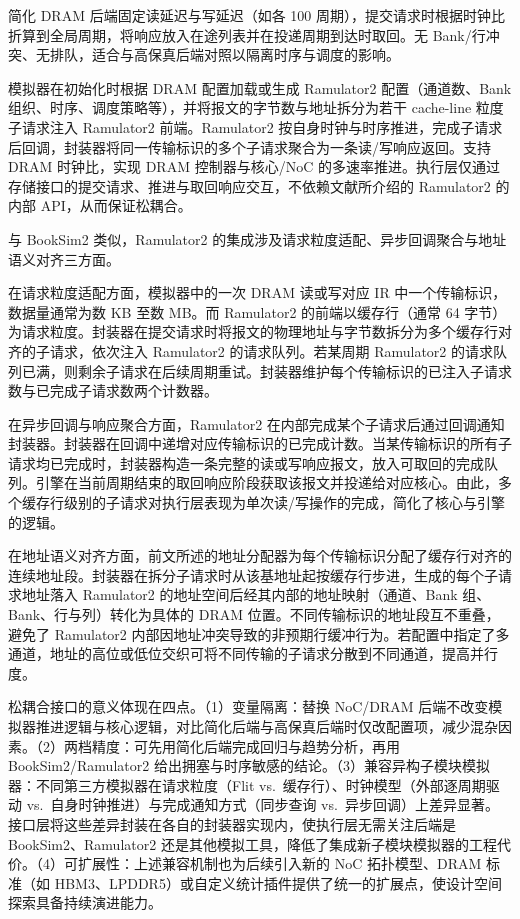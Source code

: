 
简化 DRAM 后端固定读延迟与写延迟（如各 100 周期），提交请求时根据时钟比折算到全局周期，将响应放入在途列表并在投递周期到达时取回。无 Bank/行冲突、无排队，适合与高保真后端对照以隔离时序与调度的影响。

模拟器在初始化时根据 DRAM 配置加载或生成 Ramulator2 配置（通道数、Bank 组织、时序、调度策略等），并将报文的字节数与地址拆分为若干 cache-line 粒度子请求注入 Ramulator2 前端。Ramulator2 按自身时钟与时序推进，完成子请求后回调，封装器将同一传输标识的多个子请求聚合为一条读/写响应返回。支持 DRAM 时钟比，实现 DRAM 控制器与核心/NoC 的多速率推进。执行层仅通过存储接口的提交请求、推进与取回响应交互，不依赖文献\parencite{luo2023ramulator2}所介绍的 Ramulator2 的内部 API，从而保证松耦合。

与 BookSim2 类似，Ramulator2 的集成涉及请求粒度适配、异步回调聚合与地址语义对齐三方面。

在请求粒度适配方面，模拟器中的一次 DRAM 读或写对应 IR 中一个传输标识，数据量通常为数 KB 至数 MB。而 Ramulator2 的前端以缓存行（通常 64 字节）为请求粒度。封装器在提交请求时将报文的物理地址与字节数拆分为多个缓存行对齐的子请求，依次注入 Ramulator2 的请求队列。若某周期 Ramulator2 的请求队列已满，则剩余子请求在后续周期重试。封装器维护每个传输标识的已注入子请求数与已完成子请求数两个计数器。

在异步回调与响应聚合方面，Ramulator2 在内部完成某个子请求后通过回调通知封装器。封装器在回调中递增对应传输标识的已完成计数。当某传输标识的所有子请求均已完成时，封装器构造一条完整的读或写响应报文，放入可取回的完成队列。引擎在当前周期结束的取回响应阶段获取该报文并投递给对应核心。由此，多个缓存行级别的子请求对执行层表现为单次读/写操作的完成，简化了核心与引擎的逻辑。

在地址语义对齐方面，前文所述的地址分配器为每个传输标识分配了缓存行对齐的连续地址段。封装器在拆分子请求时从该基地址起按缓存行步进，生成的每个子请求地址落入 Ramulator2 的地址空间后经其内部的地址映射（通道、Bank 组、Bank、行与列）转化为具体的 DRAM 位置。不同传输标识的地址段互不重叠，避免了 Ramulator2 内部因地址冲突导致的非预期行缓冲行为。若配置中指定了多通道，地址的高位或低位交织可将不同传输的子请求分散到不同通道，提高并行度。


松耦合接口的意义体现在四点。（1）变量隔离：替换 NoC/DRAM 后端不改变模拟器推进逻辑与核心逻辑，对比简化后端与高保真后端时仅改配置项，减少混杂因素。（2）两档精度：可先用简化后端完成回归与趋势分析，再用 BookSim2/Ramulator2 给出拥塞与时序敏感的结论。（3）兼容异构子模块模拟器：不同第三方模拟器在请求粒度（Flit vs.\ 缓存行）、时钟模型（外部逐周期驱动 vs.\ 自身时钟推进）与完成通知方式（同步查询 vs.\ 异步回调）上差异显著。接口层将这些差异封装在各自的封装器实现内，使执行层无需关注后端是 BookSim2、Ramulator2 还是其他模拟工具，降低了集成新子模块模拟器的工程代价。（4）可扩展性：上述兼容机制也为后续引入新的 NoC 拓扑模型、DRAM 标准（如 HBM3、LPDDR5）或自定义统计插件提供了统一的扩展点，使设计空间探索具备持续演进能力。

